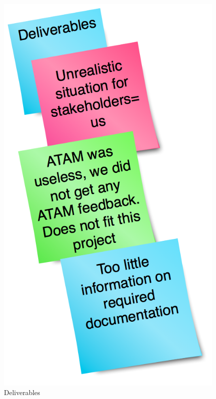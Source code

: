 \documentclass[titlepage,a4paper,11pt]{article}
\begin{document}
\begin{figure}[H]
    \begin{minipage}[b]{0.5\linewidth}
        \centering
        \includegraphics[scale=0.4]{graphics/postit/NEG_deliverables}
        \caption{Deliverables}
        \label{fig:neg1}
    \end{minipage}
    \hspace{0.5cm}
    \begin{minipage}[b]{0.5\linewidth}

\end{minipage}
\end{figure}
\end{document}
